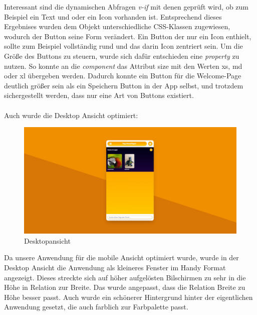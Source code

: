 \documentclass[10pt, a4paper]{article}
\begin{document}
\begin{onehalfspace}
Interessant sind die dynamischen Abfragen \textit{v-if} mit denen geprüft wird, ob zum Beispiel ein Text und oder ein Icon vorhanden ist. Entsprechend dieses Ergebnises wurden dem Objekt unterschiedliche CSS-Klassen zugewiesen, wodurch der Button seine Form verändert.
Ein Button der nur ein Icon enthielt, sollte zum Beispiel vollständig rund und das darin Icon zentriert sein.
Um die Größe des Buttons zu steuern, wurde sich dafür entschieden eine \textit{property} zu nutzen. So konnte an die \textit{component} das Attribut \glqq size\grqq{} mit den Werten \glqq xs\grqq , \glqq md\grqq{} oder \glqq xl\grqq{} übergeben werden.
Dadurch konnte ein Button für die Welcome-Page deutlich größer sein als ein Speichern Button in der App selbst, und trotzdem sichergestellt werden, dass nur eine Art von Buttons existiert.
\\~\\
Auch wurde die Desktop Ansicht optimiert:\\

\begin{figure}[ht]
  \includegraphics[width=\textwidth]{HomescreenDesktop.jpeg}
    \caption{Desktopansicht}
    \label{fig1}
\end{figure}
Da unsere Anwendung für die mobile Ansicht optimiert wurde, wurde in der Desktop Ansicht die Anwendung als kleineres Fenster im Handy Format angezeigt.
Dieses streckte sich auf höher aufgelösten Bilschirmen zu sehr in die Höhe in Relation zur Breite.
Das wurde angepasst, dass die Relation Breite zu Höhe besser passt.
Auch wurde ein schönerer Hintergrund hinter der eigentlichen Anwendung gesetzt, die auch farblich zur Farbpalette passt.
\\~\\

\end{onehalfspace}
\end{document}
